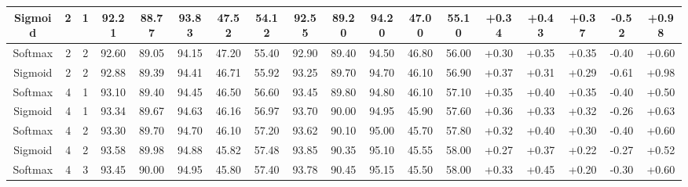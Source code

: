 \begin{table}[t]
{\begin{tabular}{@{}ccc|ccccc|ccccc|ccccc@{}}
Sigmoid & 2 & 1 & 92.21 & 88.77 & 93.83 & 47.52 & 54.12 & 92.55 & 89.20 & 94.20 & 47.00 & 55.10 & \textcolor{BestTextColor}{+0.34} & \textcolor{BestTextColor}{+0.43} & \textcolor{BestTextColor}{+0.37} & \textcolor{BestTextColor}{-0.52} & \textcolor{BestTextColor}{+0.98} \\
\midrule
Softmax & 2 & 2 & 92.60 & 89.05 & 94.15 & 47.20 & 55.40 & 92.90 & 89.40 & 94.50 & 46.80 & 56.00 & \textcolor{BestTextColor}{+0.30} & \textcolor{BestTextColor}{+0.35} & \textcolor{BestTextColor}{+0.35} & \textcolor{BestTextColor}{-0.40} & \textcolor{BestTextColor}{+0.60} \\
Sigmoid & 2 & 2 & 92.88 & 89.39 & 94.41 & 46.71 & 55.92 & 93.25 & 89.70 & 94.70 & 46.10 & 56.90 & \textcolor{BestTextColor}{+0.37} & \textcolor{BestTextColor}{+0.31} & \textcolor{BestTextColor}{+0.29} & \textcolor{BestTextColor}{-0.61} & \textcolor{BestTextColor}{+0.98} \\
\midrule
Softmax & 4 & 1 & 93.10 & 89.40 & 94.45 & 46.50 & 56.60 & 93.45 & 89.80 & 94.80 & 46.10 & 57.10 & \textcolor{BestTextColor}{+0.35} & \textcolor{BestTextColor}{+0.40} & \textcolor{BestTextColor}{+0.35} & \textcolor{BestTextColor}{-0.40} & \textcolor{BestTextColor}{+0.50} \\
Sigmoid & 4 & 1 & 93.34 & 89.67 & 94.63 & 46.16 & 56.97 & 93.70 & 90.00 & 94.95 & 45.90 & 57.60 & \textcolor{BestTextColor}{+0.36} & \textcolor{BestTextColor}{+0.33} & \textcolor{BestTextColor}{+0.32} & \textcolor{BestTextColor}{-0.26} & \textcolor{BestTextColor}{+0.63} \\
\midrule
Softmax & 4 & 2 & 93.30 & 89.70 & 94.70 & 46.10 & 57.20 & 93.62 & 90.10 & 95.00 & 45.70 & 57.80 & \textcolor{BestTextColor}{+0.32} & \textcolor{BestTextColor}{+0.40} & \textcolor{BestTextColor}{+0.30} & \textcolor{BestTextColor}{-0.40} & \textcolor{BestTextColor}{+0.60} \\
Sigmoid & 4 & 2 & 93.58 & 89.98 & 94.88 & 45.82 & 57.48 & 93.85 & 90.35 & 95.10 & 45.55 & 58.00 & \textcolor{BestTextColor}{+0.27} & \textcolor{BestTextColor}{+0.37} & \textcolor{BestTextColor}{+0.22} & \textcolor{BestTextColor}{-0.27} & \textcolor{BestTextColor}{+0.52} \\
\midrule
Softmax & 4 & 3 & 93.45 & 90.00 & 94.95 & 45.80 & 57.40 & 93.78 & 90.45 & 95.15 & 45.50 & 58.00 & \textcolor{BestTextColor}{+0.33} & \textcolor{BestTextColor}{+0.45} & \textcolor{BestTextColor}{+0.20} & \textcolor{BestTextColor}{-0.30} & \textcolor{BestTextColor}{+0.60} \\

\end{tabular}}
\end{table}
